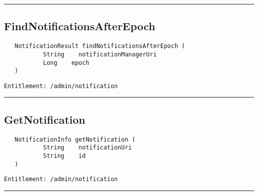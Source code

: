 \rule{12cm}{2pt}
\subsection{FindNotificationsAfterEpoch}
\label{Api:FindNotificationsAfterEpoch}
\begin{verbatim}
   NotificationResult findNotificationsAfterEpoch (
           String    notificationManagerUri
           Long    epoch
   )
\end{verbatim}
\begin{Verbatim}[fontsize=\small, formatcom=\color{Maroon}]
  Entitlement: /admin/notification
\end{Verbatim}



\rule{12cm}{2pt}
\subsection{GetNotification}
\label{Api:GetNotification}
\begin{verbatim}
   NotificationInfo getNotification (
           String    notificationUri
           String    id
   )
\end{verbatim}
\begin{Verbatim}[fontsize=\small, formatcom=\color{Maroon}]
  Entitlement: /admin/notification
\end{Verbatim}



\rule{12cm}{2pt}
